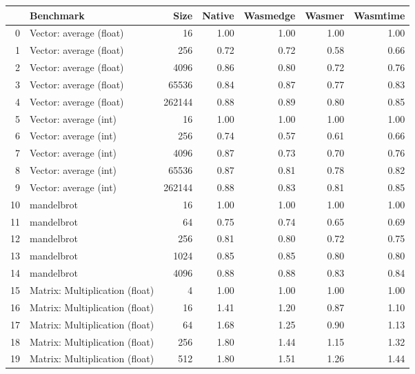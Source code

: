 \begin{tabular}{rlrrrrr}
\toprule
    & Benchmark              &   Size &   Native &   Wasmedge &   Wasmer &   Wasmtime \\
\midrule
  0 & Vector: average (float)    &     16 &   1.00 &     1.00 &   1.00 &     1.00 \\
  1 & Vector: average (float)    &    256 &   0.72 &     0.72 &   0.58 &     0.66 \\
  2 & Vector: average (float)    &   4096 &   0.86 &     0.80 &   0.72 &     0.76 \\
  3 & Vector: average (float)    &  65536 &   0.84 &     0.87 &   0.77 &     0.83 \\
  4 & Vector: average (float)    & 262144 &   0.88 &     0.89 &   0.80 &     0.85 \\
  5 & Vector: average (int)      &     16 &   1.00 &     1.00 &   1.00 &     1.00 \\
  6 & Vector: average (int)      &    256 &   0.74 &     0.57 &   0.61 &     0.66 \\
  7 & Vector: average (int)      &   4096 &   0.87 &     0.73 &   0.70 &     0.76 \\
  8 & Vector: average (int)      &  65536 &   0.87 &     0.81 &   0.78 &     0.82 \\
  9 & Vector: average (int)      & 262144 &   0.88 &     0.83 &   0.81 &     0.85 \\
 10 & mandelbrot             &     16 &   1.00 &     1.00 &   1.00 &     1.00 \\
 11 & mandelbrot             &     64 &   0.75 &     0.74 &   0.65 &     0.69 \\
 12 & mandelbrot             &    256 &   0.81 &     0.80 &   0.72 &     0.75 \\
 13 & mandelbrot             &   1024 &   0.85 &     0.85 &   0.80 &     0.80 \\
 14 & mandelbrot             &   4096 &   0.88 &     0.88 &   0.83 &     0.84 \\
 15 & Matrix: Multiplication (float) &      4 &   1.00 &     1.00 &   1.00 &     1.00 \\
 16 & Matrix: Multiplication (float) &     16 &   1.41 &     1.20 &   0.87 &     1.10 \\
 17 & Matrix: Multiplication (float) &     64 &   1.68 &     1.25 &   0.90 &     1.13 \\
 18 & Matrix: Multiplication (float) &    256 &   1.80 &     1.44 &   1.15 &     1.32 \\
 19 & Matrix: Multiplication (float) &    512 &   1.80 &     1.51 &   1.26 &     1.44 \\

\end{tabular}
